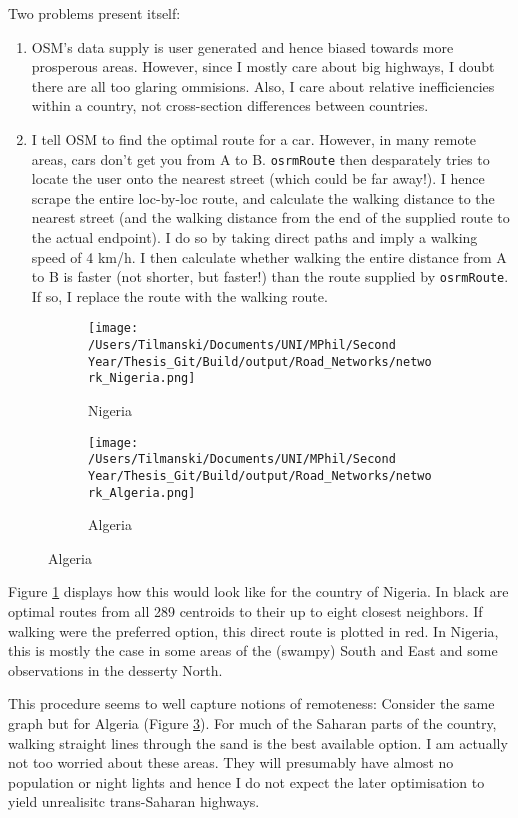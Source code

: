 \documentclass[11pt, oneside]{article}   	%
\begin{document}
Two problems present itself:
\begin{enumerate}
  \item OSM's data supply is user generated and hence biased towards more prosperous areas. However, since I mostly care about big highways, I doubt there are all too glaring ommisions. Also, I care about relative inefficiencies within a country, not cross-section differences between countries.
  \item I tell OSM to find the optimal route for a car. However, in many remote areas, cars don't get you from A to B. \texttt{osrmRoute} then desparately tries to locate the user onto the nearest street (which could be far away!). I hence scrape the entire loc-by-loc route, and calculate the walking distance to the nearest street (and the walking distance from the end of the supplied route to the actual endpoint). I do so by taking direct paths and imply a walking speed of 4 km/h. I then calculate whether walking the entire distance from A to B is faster (not shorter, but faster!) than the route supplied by \texttt{osrmRoute}. If so, I replace the route with the walking route.
\end{enumerate}

\begin{figure}[h]
\centering
\caption{Road Networks for different countries}

\begin{subfigure}[c]{0.48\textwidth}
\texttt{[image: /Users/Tilmanski/Documents/UNI/MPhil/Second Year/Thesis\_Git/Build/output/Road\_Networks/network\_Nigeria.png]}
\caption{Nigeria}
\label{fig:nigeria}
\end{subfigure}
\begin{subfigure}[c]{0.48\textwidth}
\texttt{[image: /Users/Tilmanski/Documents/UNI/MPhil/Second Year/Thesis\_Git/Build/output/Road\_Networks/network\_Algeria.png]}
\caption{Algeria}
\label{fig:algeria}
\end{subfigure}

\end{figure}

Figure \ref{fig:nigeria} displays how this would look like for the country of Nigeria. In black are optimal routes from all 289 centroids to their up to eight closest neighbors. If walking were the preferred option, this direct route is plotted in red. In Nigeria, this is mostly the case in some areas of the (swampy) South and East and some observations in the desserty North.

This procedure seems to well capture notions of remoteness: Consider the same graph but for Algeria (Figure \ref{fig:algeria}). For much of the Saharan parts of the country, walking straight lines through the sand is the best available option. I am actually not too worried about these areas. They will presumably have almost no population or night lights and hence I do not expect the later optimisation to yield unrealisitc trans-Saharan highways.


\vspace{\fill}

\begin{spacing}{1.0}
\setlength{\bibsep}{2.5pt plus 1.5ex}

\end{spacing}
\end{document}
